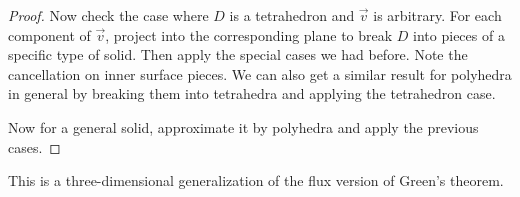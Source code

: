\begin{proof}
  Now check the case where $D$ is a tetrahedron and
  $\vec{v}$ is arbitrary. For
  each component of $\vec{v}$, project into the
  corresponding plane to break $D$ into pieces of
  a specific type of solid. Then apply the special
  cases we had before. Note the cancellation on inner
  surface pieces. We can also get a similar result for
  polyhedra in general by breaking them into tetrahedra
  and applying the tetrahedron case.

  Now for a general solid, approximate it by polyhedra
  and apply the previous cases.
\end{proof}

\begin{remark}
  This is a three-dimensional generalization of the flux
  version of Green's theorem.
\end{remark}
